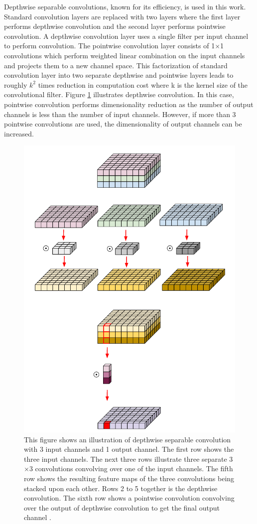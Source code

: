 Depthwise separable convolutions, known for its efficiency, is used in this work. Standard convolution layers are replaced with two layers where the first layer performs depthwise convolution and the second layer performs pointwise convolution. A depthwise convolution layer uses a single filter per input channel to perform convolution. The pointwise convolution layer consists of 1$\times$1 convolutions which perform weighted linear combination on the input channels and projects them to a new channel space. This factorization of standard convolution layer into two separate depthwise and pointwise layers leads to roughly $k^2$ times reduction in computation cost where k is the kernel size of the convolutional filter. Figure \ref{Fig:depthwise} illustrates depthwise convolution. In this case, pointwise convolution performs dimensionality reduction as the number of output channels is less than the number of input channels. However, if more than 3 pointwise convolutions are used, the dimensionality of output channels can be increased.

	\begin{figure}
		\centering
		\includegraphics[width=.5\linewidth]{images/depthwise}
		\caption{This figure shows an illustration of depthwise separable convolution with 3 input channels and 1 output channel. The first row shows the three input channels. The next three rows illustrate three separate 3$\times$3 convolutions convolving over one of the input channels. The fifth row shows the resulting feature maps of the three convolutions being stacked upon each other. Rows 2 to 5 together is the depthwise convolution. The sixth row shows a pointwise convolution convolving over the output of depthwise convolution to get the final output channel \cite{depthwise}.}
		\label{Fig:depthwise}
	\end{figure}

